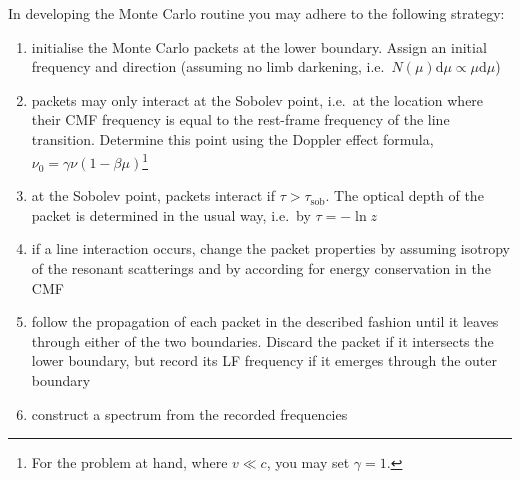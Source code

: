 \documentclass[12pt,a4paper,twoside]{article}
\begin{document}
\begin{enumerate}
  In developing the Monte Carlo routine you may adhere to the following
  strategy:
  \begin{enumerate}
    \item initialise the Monte Carlo packets at the lower boundary. Assign an
      initial frequency and direction (assuming no limb darkening, i.e.\ $N(\mu)
      \mathrm{d} \mu \propto \mu \mathrm{d}\mu$)
    \item packets may only interact at the Sobolev point, i.e.\ at the location
      where their CMF frequency is equal to the rest-frame frequency of the line
      transition. Determine this point using the Doppler effect formula, $\nu_0 =
      \gamma \nu (1 - \beta \mu)$\footnote{For the problem at hand, where $v \ll
      c$, you may set $\gamma = 1$.}
    \item at the Sobolev point, packets interact if $\tau >
      \tau_{\mathrm{sob}}$. The optical depth of the packet is determined in the
      usual way, i.e.\ by $\tau = - \ln z$
    \item if a line interaction occurs, change the packet properties by assuming
      isotropy of the resonant scatterings and by according for 
      energy conservation in the CMF 
    \item follow the propagation of each packet in the described fashion until
      it leaves through either of the two boundaries. Discard the packet if it
      intersects the lower boundary, but record its LF frequency if it emerges
      through the outer boundary
    \item construct a spectrum from the recorded frequencies
  \end{enumerate}

\end{enumerate}
\end{document}
